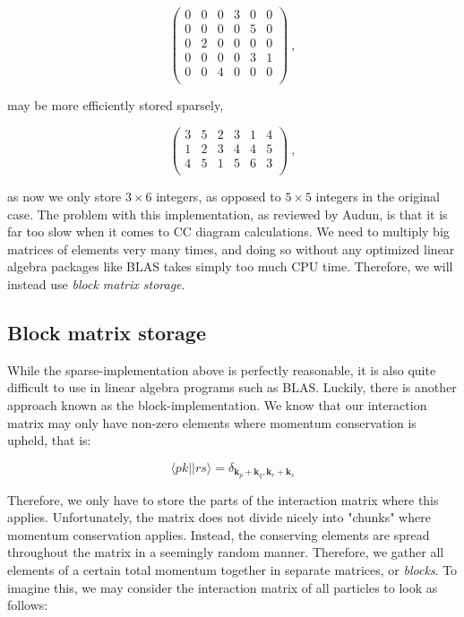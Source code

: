 \documentclass[10pt]{report}
\begin{document}
	\begin{equation*}
		\begin{pmatrix}
			0 & 0 & 0 & 3 & 0 & 0 \\
			0 & 0 & 0 & 0 & 5 & 0 \\
			0 & 2 & 0 & 0 & 0 & 0 \\
			0 & 0 & 0 & 0 & 3 & 1 \\
			0 & 0 & 4 & 0 & 0 & 0 \\
		\end{pmatrix} \:,
	\end{equation*}
	
	may be more efficiently stored sparsely,
	
	\begin{equation*}
		\begin{pmatrix}
			3 & 5 & 2 & 3 & 1 & 4 \\
			1 & 2 & 3 & 4 & 4 & 5 \\
			4 & 5 & 1 & 5 & 6 & 3 \\
		\end{pmatrix} \:,
	\end{equation*}
	
	as now we only store $3\times6$ integers, as opposed to $5\times5$ integers in the original case. The problem with this implementation, as reviewed by Audun, is that it is far too slow when it comes to CC diagram calculations. We need to multiply big matrices of elements very many times, and doing so without any optimized linear algebra packages like BLAS takes simply too much CPU time. Therefore, we will instead use \emph{block matrix storage}.
	
	\subsection{Block matrix storage}
	While the sparse-implementation above is perfectly reasonable, it is also quite difficult to use in linear algebra programs such as BLAS. Luckily, there is another approach known as the block-implementation. We know that our interaction matrix may only have non-zero elements where momentum conservation is upheld, that is:
	
	\begin{equation}
		\langle pk||rs\rangle = \delta_{\bm{k}_p + \bm{k}_q,\bm{k}_r + \bm{k}_s}
	\end{equation}
	
	Therefore, we only have to store the parts of the interaction matrix where this applies. Unfortunately, the matrix does not divide nicely into "chunks" where momentum conservation applies. Instead, the conserving elements are spread throughout the matrix in a seemingly random manner. Therefore, we gather all elements of a certain total momentum together in separate matrices, or \emph{blocks}. To imagine this, we may consider the interaction matrix of all particles to look as follows:
	
\end{document}
